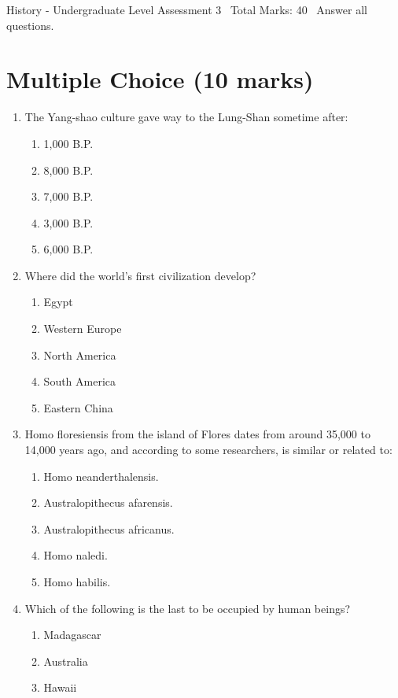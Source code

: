 \documentclass[12pt]{article}
\begin{document}
\begin{center}
History - Undergraduate Level Assessment 3 \
Total Marks: 40 \
Answer all questions.
\end{center}

\section*{Multiple Choice (10 marks)}
\begin{enumerate}[label=\arabic*.]
\item The Yang-shao culture gave way to the Lung-Shan sometime after:
\begin{enumerate}[label=(\alph*)]
    \item 1,000 B.P.
    \item 8,000 B.P.
    \item 7,000 B.P.
    \item 3,000 B.P.
    \item 6,000 B.P.
\end{enumerate}
\item Where did the world's first civilization develop?
\begin{enumerate}[label=(\alph*)]
    \item Egypt
    \item Western Europe
    \item North America
    \item South America
    \item Eastern China
\end{enumerate}
\item Homo floresiensis from the island of Flores dates from around 35,000 to 14,000 years ago, and according to some researchers, is similar or related to:
\begin{enumerate}[label=(\alph*)]
    \item Homo neanderthalensis.
    \item Australopithecus afarensis.
    \item Australopithecus africanus.
    \item Homo naledi.
    \item Homo habilis.
\end{enumerate}
\item Which of the following is the last to be occupied by human beings?
\begin{enumerate}[label=(\alph*)]
    \item Madagascar
    \item Australia
    \item Hawaii

\end{enumerate}
\end{enumerate}
\end{document}
